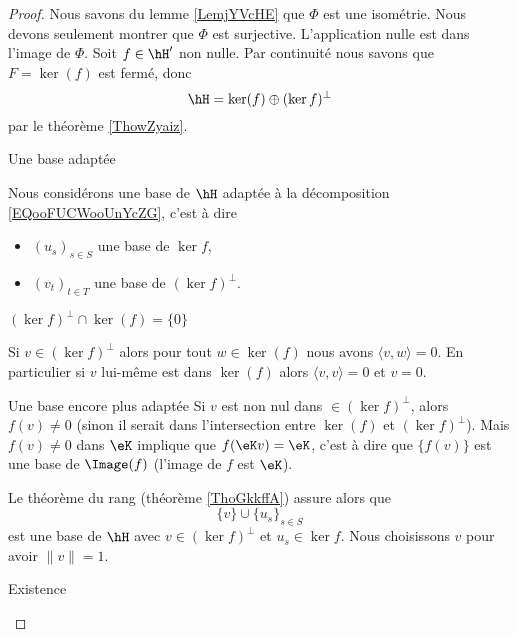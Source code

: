 \begin{proof}
    Nous savons du lemme \ref{LemjYVcHE} que \(\Phi\) est une isométrie. Nous devons seulement montrer que \( \Phi\) est surjective. L'application nulle est dans l'image de \( \Phi\). Soit \( f\in \hH'\) non nulle. Par continuité nous savons que \( F=\ker(f)\) est fermé, donc
    \begin{equation}    \label{EQooFUCWooUnYcZG}
        \hH=\ker(f)\oplus(\ker f)^{\perp}
    \end{equation}
    par le théorème \ref{ThowZyaiz}. 
    
    \begin{subproof}
        \item[Une base adaptée]
    
            Nous considérons une base de \( \hH\) adaptée à la décomposition \ref{EQooFUCWooUnYcZG}, c'est à dire
    \begin{itemize}
        \item \( (u_s)_{s\in S}\) une base de \( \ker f\),
        \item
            \( (v_t)_{t\in T}\) une base de \( (\ker f)^{\perp}\).
    \end{itemize}

\item[\( (\ker f)^{\perp}\cap\ker(f)=\{ 0 \}  \)]

    Si \( v\in (\ker f)^{\perp}\) alors pour tout \( w\in \ker(f)\) nous avons \( \langle v, w\rangle =0\). En particulier si \( v\) lui-même est dans \( \ker(f)\) alors \( \langle v, v\rangle =0\) et \( v=0\).
    
\item[Une base encore plus adaptée]
    Si \( v\) est non nul dans \( \in (\ker f)^{\perp}\), alors \( f(v)\neq 0\) (sinon il serait dans l'intersection entre \( \ker(f)\) et \( (\ker f)^{\perp}\)). Mais \( f(v)\neq 0\) dans \( \eK\) implique que \( f(\eK v)=\eK\), c'est à dire que \( \{ f(v) \}\) est une base de \( \Image(f)\) (l'image de \( f\) est \( \eK\)).
    
    Le théorème du rang (théorème \ref{ThoGkkffA}) assure alors que
    \begin{equation}
        \{ v \}\cup\{ u_s \}_{s\in S}
    \end{equation}
    est une base de \( \hH\) avec \( v\in(\ker f)^{\perp}\) et \( u_s\in \ker f\). Nous choisissons \( v\) pour avoir \( \| v \|=1\).

\item[Existence]


\end{subproof}
\end{proof}
